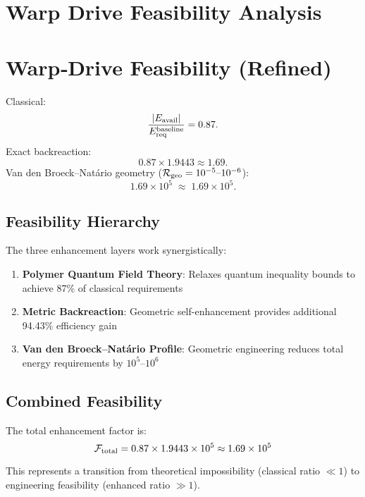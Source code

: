 \documentclass[11pt]{article}
\begin{document}
\section*{Warp Drive Feasibility Analysis}

\section{Warp‐Drive Feasibility (Refined)}
Classical: 
\[
  \frac{|E_{\rm avail}|}{E_{\rm req}^{\rm baseline}} = 0.87.
\]
Exact backreaction: 
\[
  0.87 \times 1.9443 \approx 1.69.
\]
Van den Broeck–Natário geometry ($\mathcal{R}_{\rm geo} = 10^{-5}\text{–}10^{-6}$): 
\[
  1.69 \times 10^{5} \;\approx\; 1.69\times10^5.
\]

\subsection*{Feasibility Hierarchy}
The three enhancement layers work synergistically:

\begin{enumerate}
\item \textbf{Polymer Quantum Field Theory}: Relaxes quantum inequality bounds to achieve 87\% of classical requirements
\item \textbf{Metric Backreaction}: Geometric self-enhancement provides additional 94.43\% efficiency gain
\item \textbf{Van den Broeck–Natário Profile}: Geometric engineering reduces total energy requirements by $10^5$–$10^6$
\end{enumerate}

\subsection*{Combined Feasibility}
The total enhancement factor is:
\[
  \mathcal{F}_{\rm total} = 0.87 \times 1.9443 \times 10^5 \approx 1.69 \times 10^5
\]

This represents a transition from theoretical impossibility (classical ratio $\ll 1$) to engineering feasibility (enhanced ratio $\gg 1$).
\end{document}

